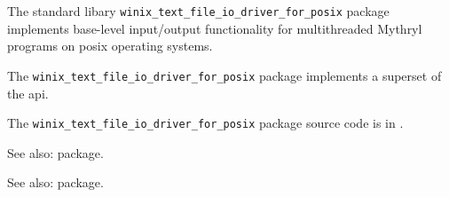 
The standard libary {\tt winix\_text\_file\_io\_driver\_for\_posix} package implements base-level input/output functionality for multithreaded Mythryl programs on posix operating systems.

The {\tt winix\_text\_file\_io\_driver\_for\_posix} package implements a superset of the  api.

The {\tt winix\_text\_file\_io\_driver\_for\_posix} package source code is in .

See also:  package.

See also:  package.


